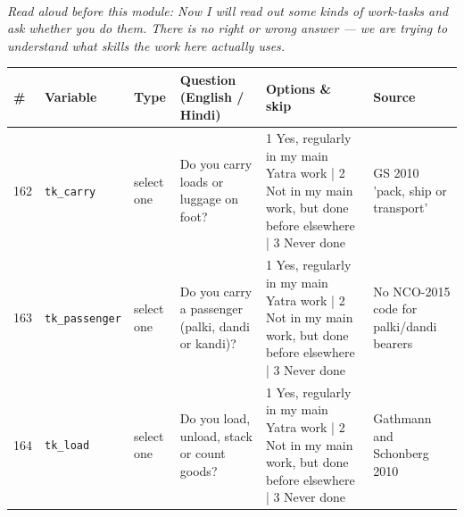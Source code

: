 \documentclass[9pt,a4paper,landscape]{article}
\begin{document}
\\[3pt]
{\small\itshape Read aloud before this module: Now I will read out some kinds of work-tasks and ask whether you do them. There is no right or wrong answer — we are trying to understand what skills the work here actually uses.}\\[5pt]
\begin{longtable}{@{}p{0.5cm}p{3.3cm}p{1.7cm}p{7.3cm}p{5.6cm}p{5.4cm}@{}}
\toprule \footnotesize\textbf{\#} & \footnotesize\textbf{Variable} & \footnotesize\textbf{Type} & \footnotesize\textbf{Question (English / Hindi)} & \footnotesize\textbf{Options {\&} skip} & \footnotesize\textbf{Source}\\ \midrule
\endhead
\footnotesize 162 & \footnotesize\texttt{tk\_carry} & \scriptsize select one & \footnotesize Do you carry loads or luggage on foot? \par\vspace{1pt}{\footnotesize\color{hdr}{\hifont क्या आप पैदल सामान या बोझ ढोना का काम करते हैं? (1 अपने मुख्य यात्रा-काम में नियमित; 2 मुख्य काम में नहीं, पर पहले कहीं और किया है; 3 कभी नहीं)}} & \scriptsize 1 Yes, regularly in my main Yatra work | 2 Not in my main work, but done before elsewhere | 3 Never done & \scriptsize GS 2010 'pack, ship or transport'\\
\footnotesize 163 & \footnotesize\texttt{tk\_passenger} & \scriptsize select one & \footnotesize Do you carry a passenger (palki, dandi or kandi)? \par\vspace{1pt}{\footnotesize\color{hdr}{\hifont क्या आप सवारी ढोना (पालकी, डंडी या कंडी) का काम करते हैं? (1 अपने मुख्य यात्रा-काम में नियमित; 2 मुख्य काम में नहीं, पर पहले कहीं और किया है; 3 कभी नहीं)}} & \scriptsize 1 Yes, regularly in my main Yatra work | 2 Not in my main work, but done before elsewhere | 3 Never done & \scriptsize No NCO-2015 code for palki/dandi bearers\\
\footnotesize 164 & \footnotesize\texttt{tk\_load} & \scriptsize select one & \footnotesize Do you load, unload, stack or count goods? \par\vspace{1pt}{\footnotesize\color{hdr}{\hifont क्या आप सामान चढ़ाना-उतारना, लगाना या गिनना का काम करते हैं? (1 अपने मुख्य यात्रा-काम में नियमित; 2 मुख्य काम में नहीं, पर पहले कहीं और किया है; 3 कभी नहीं)}} & \scriptsize 1 Yes, regularly in my main Yatra work | 2 Not in my main work, but done before elsewhere | 3 Never done & \scriptsize Gathmann and Schonberg 2010\\

\end{longtable}
\end{document}
